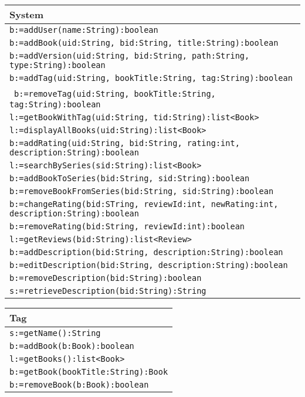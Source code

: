 \documentclass[12pt]{article}
\begin{document}
\begin{tabular}{| l |}
    \hline
    System\\
    \hline
    \texttt{b:=addUser(name:String):boolean}\\
    \texttt{b:=addBook(uid:String, bid:String, title:String):boolean}\\
    \texttt{b:=addVersion(uid:String, bid:String, path:String, type:String):boolean}\\
    \texttt{b:=addTag(uid:String, bookTitle:String, tag:String):boolean}\\\
    \texttt{b:=removeTag(uid:String, bookTitle:String, tag:String):boolean}\\
    \texttt{l:=getBookWithTag(uid:String, tid:String):list<Book>}\\
    \texttt{l:=displayAllBooks(uid:String):list<Book>}\\
    \texttt{b:=addRating(uid:String, bid:String, rating:int, description:String):boolean}\\
    \texttt{l:=searchBySeries(sid:String):list<Book>}\\
    \texttt{b:=addBookToSeries(bid:String, sid:String):boolean}\\
    \texttt{b:=removeBookFromSeries(bid:String, sid:String):boolean}\\
    \texttt{b:=changeRating(bid:STring, reviewId:int, newRating:int, description:String):boolean}\\
    \texttt{b:=removeRating(bid:String, reviewId:int):boolean}\\
    \texttt{l:=getReviews(bid:String):list<Review>}\\
    \texttt{b:=addDescription(bid:String, description:String):boolean}\\
    \texttt{b:=editDescription(bid:String, description:String):boolean}\\
    \texttt{b:=removeDescription(bid:String):boolean}\\
    \texttt{s:=retrieveDescription(bid:String):String}\\
    \hline
    
\end{tabular}
\vspace{1cm}

\begin{tabular}{| l |}
    \hline
    Tag\\
    \hline
    \texttt{s:=getName():String}\\
    \texttt{b:=addBook(b:Book):boolean}\\
    \texttt{l:=getBooks():list<Book>}\\
    \texttt{b:=getBook(bookTitle:String):Book}\\
    \texttt{b:=removeBook(b:Book):boolean}\\
    \hline
    
\end{tabular}
\vspace{1cm}
\end{document}
